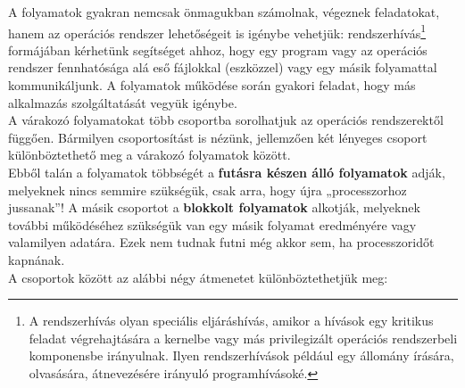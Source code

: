\documentclass[tikz,12pt,margin=0px]{article}
\begin{document}
    \noindent A folyamatok gyakran nemcsak önmagukban számolnak, végeznek feladatokat, hanem az operációs rendszer lehetőségeit is igénybe vehetjük: rendszerhívás\footnote{A rendszerhívás olyan speciális eljáráshívás, amikor a hívások egy kritikus feladat végrehajtására a kernelbe vagy más privilegizált operációs rendszerbeli komponensbe irányulnak. Ilyen rendszerhívások például egy állomány írására, olvasására, átnevezésére irányuló programhívásoké.} formájában kérhetünk segítséget ahhoz, hogy egy program vagy az operációs rendszer fennhatósága alá eső fájlokkal (eszközzel) vagy egy másik folyamattal kommunikáljunk. A folyamatok működése során gyakori feladat, hogy más alkalmazás szolgáltatását vegyük igénybe.\\

    \noindent A várakozó folyamatokat több csoportba sorolhatjuk az operációs rendszerektől függően. Bármilyen csoportosítást is nézünk, jellemzően két lényeges csoport különböztethető meg a várakozó folyamatok között.\\

    \noindent Ebből talán a folyamatok többségét a \textbf{futásra készen álló folyamatok} adják, melyeknek nincs semmire szükségük, csak arra, hogy újra „processzorhoz jussanak”! A másik csoportot a \textbf{blokkolt folyamatok} alkotják, melyeknek további működéséhez szükségük van egy másik folyamat eredményére vagy valamilyen adatára. Ezek nem tudnak futni még akkor sem, ha processzoridőt kapnának.\\
\newpage
    \noindent A csoportok között az alábbi négy átmenetet különböztethetjük meg:
\end{document}
